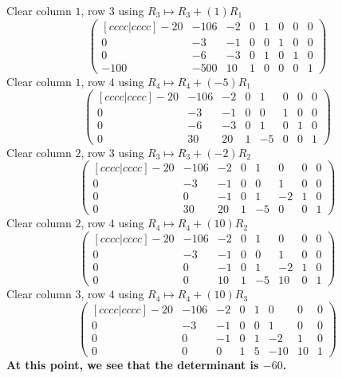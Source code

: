 \documentclass{article}
\begin{document}
Clear column \(1\), row \(3\) using \(R_3\mapsto
R_3+(1)R_1\)\[\begin{pmatrix}[ c c c c | c c c c ] -20 & -106 & -2 & 0
& 1 & 0 & 0 & 0 \\ 0 & -3 & -1 & 0 & 0 & 1 & 0 & 0 \\ 0 & -6 & -3 & 0
& 1 & 0 & 1 & 0 \\ -100 & -500 & 10 & 1 & 0 & 0 & 0 & 1
\end{pmatrix}\]Clear column \(1\), row \(4\) using \(R_4\mapsto
R_4+(-5)R_1\)\[\begin{pmatrix}[ c c c c | c c c c ] -20 & -106 & -2 &
0 & 1 & 0 & 0 & 0 \\ 0 & -3 & -1 & 0 & 0 & 1 & 0 & 0 \\ 0 & -6 & -3 &
0 & 1 & 0 & 1 & 0 \\ 0 & 30 & 20 & 1 & -5 & 0 & 0 & 1
\end{pmatrix}\]Clear column \(2\), row \(3\) using \(R_3\mapsto
R_3+(-2)R_2\)\[\begin{pmatrix}[ c c c c | c c c c ] -20 & -106 & -2 &
0 & 1 & 0 & 0 & 0 \\ 0 & -3 & -1 & 0 & 0 & 1 & 0 & 0 \\ 0 & 0 & -1 & 0
& 1 & -2 & 1 & 0 \\ 0 & 30 & 20 & 1 & -5 & 0 & 0 & 1
\end{pmatrix}\]Clear column \(2\), row \(4\) using \(R_4\mapsto
R_4+(10)R_2\)\[\begin{pmatrix}[ c c c c | c c c c ] -20 & -106 & -2 &
0 & 1 & 0 & 0 & 0 \\ 0 & -3 & -1 & 0 & 0 & 1 & 0 & 0 \\ 0 & 0 & -1 & 0
& 1 & -2 & 1 & 0 \\ 0 & 0 & 10 & 1 & -5 & 10 & 0 & 1
\end{pmatrix}\]Clear column \(3\), row \(4\) using \(R_4\mapsto
R_4+(10)R_3\)\[\begin{pmatrix}[ c c c c | c c c c ] -20 & -106 & -2 &
0 & 1 & 0 & 0 & 0 \\ 0 & -3 & -1 & 0 & 0 & 1 & 0 & 0 \\ 0 & 0 & -1 & 0
& 1 & -2 & 1 & 0 \\ 0 & 0 & 0 & 1 & 5 & -10 & 10 & 1 \end{pmatrix}\]
{\bf At this point, we see that the determinant is \(-60\).}
\end{document}

